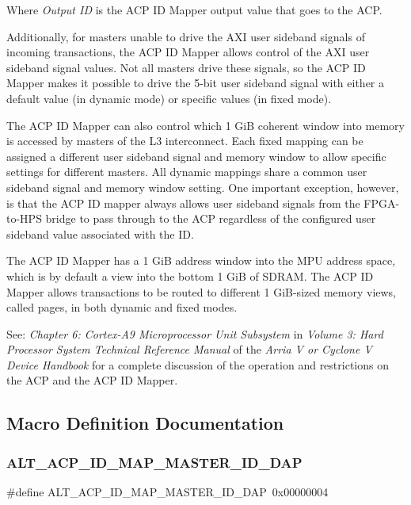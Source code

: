 Where {\itshape Output ID} is the A\+CP ID Mapper output value that goes to the A\+CP.

Additionally, for masters unable to drive the A\+XI user sideband signals of incoming transactions, the A\+CP ID Mapper allows control of the A\+XI user sideband signal values. Not all masters drive these signals, so the A\+CP ID Mapper makes it possible to drive the 5-\/bit user sideband signal with either a default value (in dynamic mode) or specific values (in fixed mode).

The A\+CP ID Mapper can also control which 1 GiB coherent window into memory is accessed by masters of the L3 interconnect. Each fixed mapping can be assigned a different user sideband signal and memory window to allow specific settings for different masters. All dynamic mappings share a common user sideband signal and memory window setting. One important exception, however, is that the A\+CP ID mapper always allows user sideband signals from the F\+P\+G\+A-\/to-\/\+H\+PS bridge to pass through to the A\+CP regardless of the configured user sideband value associated with the ID.

The A\+CP ID Mapper has a 1 GiB address window into the M\+PU address space, which is by default a view into the bottom 1 GiB of S\+D\+R\+AM. The A\+CP ID Mapper allows transactions to be routed to different 1 Gi\+B-\/sized memory views, called pages, in both dynamic and fixed modes.

See\+: {\itshape Chapter 6\+: Cortex-\/\+A9 Microprocessor Unit Subsystem} in {\itshape Volume 3\+: Hard Processor System Technical Reference Manual} of the {\itshape Arria V or Cyclone V Device Handbook} for a complete discussion of the operation and restrictions on the A\+CP and the A\+CP ID Mapper. 

\subsection{Macro Definition Documentation}
\mbox{\label{group__ADDR__SPACE__MGR__MEM__COHERENCE_ga753431b5fe93c48c23c2109527a05bf7}} 
\subsubsection{\texorpdfstring{ALT\_ACP\_ID\_MAP\_MASTER\_ID\_DAP}{ALT\_ACP\_ID\_MAP\_MASTER\_ID\_DAP}}
{\footnotesize\ttfamily \#define A\+L\+T\+\_\+\+A\+C\+P\+\_\+\+I\+D\+\_\+\+M\+A\+P\+\_\+\+M\+A\+S\+T\+E\+R\+\_\+\+I\+D\+\_\+\+D\+AP~0x00000004}

